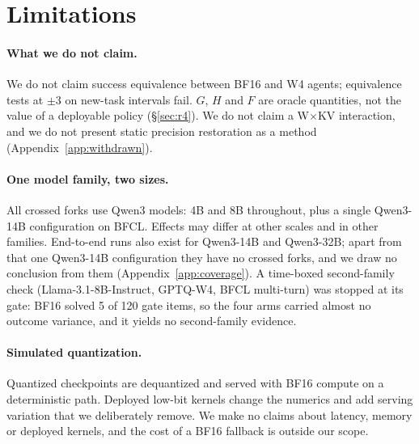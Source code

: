 \section*{Limitations}

\paragraph{What we do not claim.} We do not claim success equivalence between BF16 and W4 agents; equivalence tests at $\pm$3\pp{} on new-task intervals fail. %
$G$, $H$ and $F$ are oracle quantities, not the value of a deployable policy (\S\ref{sec:r4}). We do not claim a W$\times$KV interaction, and we do not present static precision restoration as a method (Appendix~\ref{app:withdrawn}).

\paragraph{One model family, two sizes.} All crossed forks use Qwen3 models: 4B and 8B throughout, plus a single Qwen3-14B configuration on BFCL. %
 Effects may differ at other scales and in other families. End-to-end runs also exist for Qwen3-14B and Qwen3-32B; apart from that one Qwen3-14B configuration they have no crossed forks, and we draw no conclusion from them (Appendix~\ref{app:coverage}). A time-boxed second-family check (Llama-3.1-8B-Instruct, GPTQ-W4, BFCL multi-turn) was stopped at its gate: BF16 solved 5 of 120 gate items, so the four arms carried almost no outcome variance, and it yields no second-family evidence. %

\paragraph{Simulated quantization.} Quantized checkpoints are dequantized and served with BF16 compute on a deterministic path. Deployed low-bit kernels change the numerics and add serving variation that we deliberately remove. We make no claims about latency, memory or deployed kernels, and the cost of a BF16 fallback is outside our scope.

